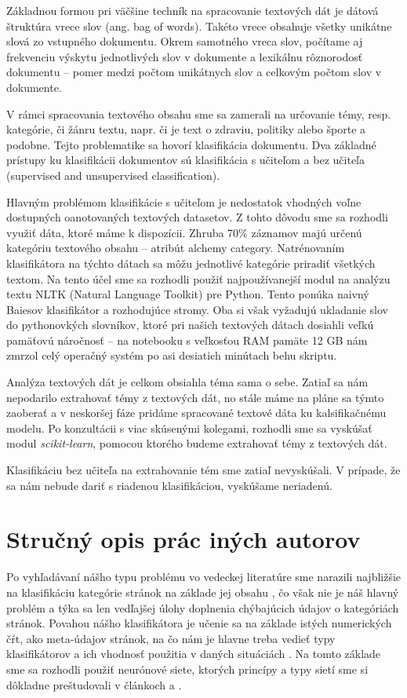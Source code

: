 \documentclass{iitsrc}
\begin{document}
\begin{multicols}{2}
Základnou formou pri väčšine techník na spracovanie textových dát je dátová štruktúra vrece slov (ang. bag of words). Takéto vrece obsahuje všetky unikátne slová zo vstupného dokumentu. Okrem samotného vreca slov, počítame aj frekvenciu výskytu jednotlivých slov v dokumente a lexikálnu rôznorodosť dokumentu – pomer medzi počtom unikátnych slov a celkovým počtom slov v dokumente.

V rámci spracovania textového obsahu sme sa zamerali na určovanie témy, resp. kategórie, či žánru textu, napr. či je text o zdraviu, politiky alebo športe a podobne. Tejto problematike sa hovorí klasifikácia dokumentu. Dva základné prístupy ku klasifikácii dokumentov sú klasifikácia s učiteľom a bez učiteľa (supervised and unsupervised classification).

Hlavným problémom klasifikácie s učiteľom je nedostatok vhodných voľne dostupných oanotovaných textových datasetov. Z tohto dôvodu sme sa rozhodli využiť dáta, ktoré máme k dispozícii. Zhruba 70\% záznamov majú určenú kategóriu textového obsahu – atribút alchemy category. Natrénovaním klasifikátora na týchto dátach sa môžu jednotlivé kategórie priradiť všetkých textom. Na tento účel sme sa rozhodli použiť najpoužívanejší modul na analýzu textu NLTK (Natural Language Toolkit) pre Python. Tento ponúka naivný Baiesov klasifikátor a rozhodujúce stromy. Oba si však vyžadujú ukladanie slov do pythonovkých slovníkov, ktoré pri našich textových dátach dosiahli veľkú pamäťovú náročnosť – na notebooku s veľkosťou RAM pamäte 12 GB nám zmrzol celý operačný systém po asi desiatich minútach behu skriptu.

Analýza textových dát je celkom obsiahla téma sama o sebe. Zatiaľ sa nám nepodarilo extrahovať témy z textových dát, no stále máme na pláne sa týmto zaoberať a v neskoršej fáze pridáme spracované textové dáta ku kalsifikačnému modelu. Po konzultácii s viac skúsenými kolegami, rozhodli sme sa vyskúšať modul \emph{scikit-learn}, pomocou ktorého budeme extrahovať témy z textových dát.

Klasifikáciu bez učiteľa na extrahovanie tém sme zatiaľ nevyskúšali. V prípade, že sa nám nebude dariť s riadenou klasifikáciou, vyskúšame neriadenú.

\section{Stručný opis prác iných autorov}
Po vyhľadávaní nášho typu problému vo vedeckej literatúre sme narazili najbližšie na klasifikáciu kategórie stránok na základe jej obsahu \cite{kosala2000web}, čo však nie je náš hlavný problém a týka sa len vedľajšej úlohy doplnenia chýbajúcich údajov o kategóriách stránok. Povahou nášho klasifikátora je učenie sa na základe istých numerických čŕt, ako meta-údajov stránok, na čo nám je hlavne treba vedieť typy klasifikátorov a ich vhodnosť použitia v daných situáciách \cite{qi2009web}.  Na tomto základe sme sa rozhodli použiť neurónové siete, ktorých princípy a typy sietí sme si dôkladne preštudovali v článkoch \cite{de1997brief} a \cite{lek1999artificial}.


\end{multicols}
\end{document}

